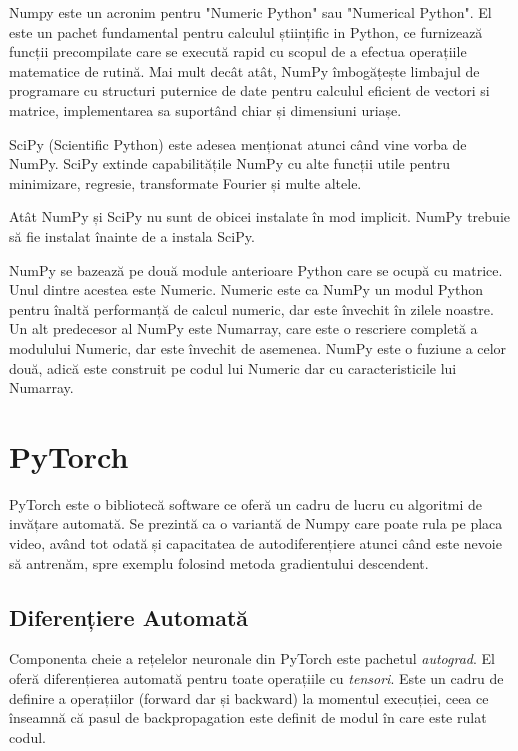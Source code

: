 Numpy este un acronim pentru "Numeric Python" sau "Numerical Python". El este un pachet fundamental pentru calculul științific in Python, ce furnizează funcții precompilate care se execută rapid cu scopul de a efectua operațiile matematice de rutină.  Mai mult decât atât, NumPy îmbogățește limbajul de programare cu structuri puternice de date pentru calculul eficient de vectori si matrice, implementarea sa suportând chiar și dimensiuni uriașe.

SciPy (Scientific Python) este adesea menționat atunci când vine vorba de NumPy. SciPy extinde capabilitățile NumPy cu alte funcții utile pentru minimizare, regresie, transformate Fourier și multe altele.

Atât NumPy și SciPy nu sunt de obicei instalate în mod implicit. NumPy trebuie să fie instalat înainte de a instala SciPy. 

NumPy se bazează pe două module anterioare Python care se ocupă cu matrice. Unul dintre acestea este Numeric. Numeric este ca NumPy un modul Python pentru înaltă performanță de calcul numeric, dar este învechit în zilele noastre. Un alt predecesor al NumPy este Numarray, care este o rescriere completă a modulului Numeric, dar este învechit de asemenea. NumPy este o fuziune a celor două, adică este construit pe codul lui Numeric dar cu caracteristicile lui Numarray.

\section{PyTorch}


PyTorch este o bibliotecă software ce oferă un cadru de lucru cu algoritmi de invățare automată. Se prezintă ca o variantă de Numpy care poate rula pe placa video, având tot odată și capacitatea de autodiferențiere atunci când este nevoie să antrenăm, spre exemplu folosind metoda gradientului descendent.

\subsection{Diferențiere Automată}

Componenta cheie a rețelelor neuronale din PyTorch este pachetul \textit{autograd}. El oferă diferențierea automată pentru toate operațiile cu \textit{tensori}. Este un cadru de definire a operațiilor (forward dar și backward) la momentul execuției, ceea ce înseamnă că pasul de backpropagation este definit de modul în care este rulat codul.

